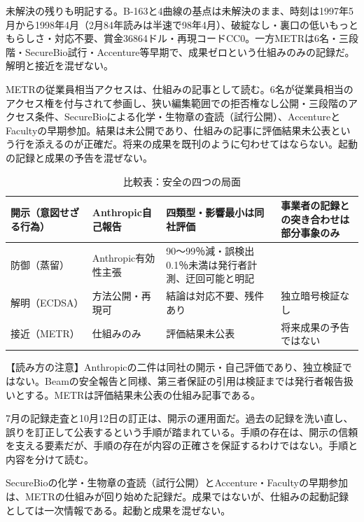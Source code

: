 \documentclass[lualatex,a4paper,10pt]{jlreq}
\begin{document}
未解決の残りも明記する。B-163と4曲線の基点は未解決のまま、時刻は1997年5月から1998年4月（2月84年読みは半速で98年4月）、破綻なし・裏口の低いもっともらしさ・対応不要、賞金36864ドル・再現コードCC0。一方METRは6名・三段階・SecureBio試行・Accenture等早期で、成果ゼロという仕組みのみの記録だ。解明と接近を混ぜない。
\cite{B42,B81,B39,B82}


METRの従業員相当アクセスは、仕組みの記事として読む。6名が従業員相当のアクセス権を付与されて参画し、狭い編集範囲での拒否権なし公開・三段階のアクセス条件、SecureBioによる化学・生物章の査読（試行公開）、AccentureとFacultyの早期参加。結果は未公開であり、仕組みの記事に評価結果未公表という行を添えるのが正確だ。将来の成果を既刊のように匂わせてはならない。起動の記録と成果の予告を混ぜない。
\cite{B39,B82}


\begin{table}[htbp]\centering\footnotesize
\caption{比較表：安全の四つの局面}
\begin{tabularx}{0.96\linewidth}{@{}lXXX@{}}
\toprule
開示（意図せざる行為） & Anthropic自己報告 & 四類型・影響最小は同社評価 & 事業者の記録との突き合わせは部分事象のみ \cite{B40,B79} \\
\midrule
防御（蒸留） & Anthropic有効性主張 & 90〜99％減・誤検出0.1％未満は発行者計測、迂回可能と明記 \cite{B41,B80} \\
\midrule
解明（ECDSA） & 方法公開・再現可 & 結論は対応不要、残件あり & 独立暗号検証なし \cite{B42,B81} \\
\midrule
接近（METR） & 仕組みのみ & 評価結果未公表 & 将来成果の予告ではない \cite{B39,B82} \\
\bottomrule
\end{tabularx}
\end{table}

\begin{tcolorbox}[colback=SurveySoft,colframe=SurveyRule,arc=1mm,boxrule=0.4pt,left=2mm,right=2mm]
【読み方の注意】Anthropicの二件は同社の開示・自己評価であり、独立検証ではない。Beamの安全報告と同様、第三者保証の引用は検証までは発行者報告扱いとする。METRは評価結果未公表の仕組み記事である。
\end{tcolorbox}
\cite{B40,B79,B41,B80,B42,B81,B39,B82}

7月の記録走査と10月12日の訂正は、開示の運用面だ。過去の記録を洗い直し、誤りを訂正して公表するという手順が踏まれている。手順の存在は、開示の信頼を支える要素だが、手順の存在が内容の正確さを保証するわけではない。手順と内容を分けて読む。
\cite{B40,B79}


SecureBioの化学・生物章の査読（試行公開）とAccenture・Facultyの早期参加は、METRの仕組みが回り始めた記録だ。成果ではないが、仕組みの起動記録としては一次情報である。起動と成果を混ぜない。
\cite{B39,B82}
\end{document}
